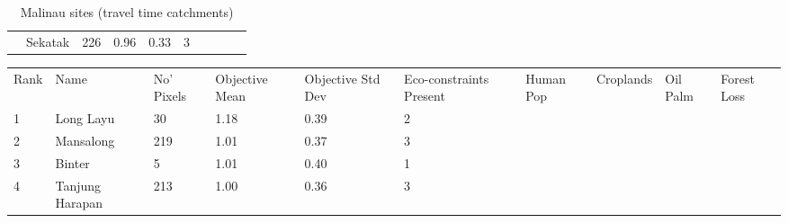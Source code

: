 \begin{table}[ht]
\begin{tabular}{C{0.05\textwidth}C{0.15\textwidth}C{0.08\textwidth}C{0.08\textwidth}C{0.08\textwidth}C{0.08\textwidth}C{0.08\textwidth}C{0.08\textwidth}C{0.08\textwidth}C{0.08\textwidth}}
   & Sekatak & 226 & \textcolor[HTML]{000000}{0.96} & \textcolor[HTML]{FFFFFF}{0.33} & \textcolor[HTML]{FFFFFF}{3} &  &  &  &  \\ 
  \end{tabular}
\endgroup
\caption{Malinau sites (travel time catchments)} 
\end{table}
\begin{table}[ht]
\centering
\begingroup\fontsize{9pt}{10pt}\selectfont
\begin{tabular}{C{0.05\textwidth}C{0.15\textwidth}C{0.08\textwidth}C{0.08\textwidth}C{0.08\textwidth}C{0.08\textwidth}C{0.08\textwidth}C{0.08\textwidth}C{0.08\textwidth}C{0.08\textwidth}}
 Rank & Name & No' Pixels & Objective Mean & Objective Std Dev & Eco-constraints  Present & Human Pop & Croplands & Oil Palm & Forest Loss \\ 
 {1} & Long Layu &  30 & \textcolor[HTML]{FFFFFF}{1.18} & \textcolor[HTML]{000000}{0.39} & \textcolor[HTML]{000000}{2} &  &  &  &  \\ 
  {2} & Mansalong & 219 & \textcolor[HTML]{FFFFFF}{1.01} & \textcolor[HTML]{000000}{0.37} & \textcolor[HTML]{000000}{3} &  &  &  &  \\ 
  {3} & Binter &   5 & \textcolor[HTML]{FFFFFF}{1.01} & \textcolor[HTML]{000000}{0.40} & \textcolor[HTML]{000000}{1} &  &  &  &  \\ 
  {4} & Tanjung Harapan & 213 & \textcolor[HTML]{FFFFFF}{1.00} & \textcolor[HTML]{000000}{0.36} & \textcolor[HTML]{000000}{3} &  &  &  &  \\ 

\end{tabular}
\end{table}
